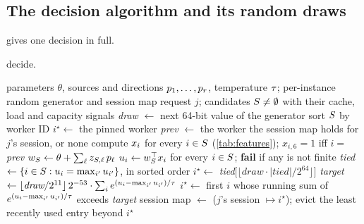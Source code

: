 \subsection{The decision algorithm and its random draws}

 gives one decision in full.

\begin{algorithm}[tbp]
\caption{One \lc{} decision. Before the call, the host has fixed the eligible set $\cand$ and
  written each candidate's default cost $\cdef_i$ at default weights. The draw discipline is
  ; under  there is no up-front draw, a tie draws once per tied
  candidate during the scan, a sample draws one uniform, and a pin draws nothing, as in
  .}
\label{alg:decide}
\expandafter\def\csname theHALG@line\endcsname{decide.}%
\begin{algorithmic}[1]
\Require parameters $\theta$, sources and directions $p_1,\dots,p_{r}$, temperature $\tau$;
  per-instance random generator and session map
\Require request $j$; candidates $S \ne \emptyset$ with their cache, load and capacity signals
\State \textit{draw} $\gets$ next 64-bit value of the generator 
\State sort $\cand$ by worker ID 
  \State $i^{\star} \gets$ the pinned worker
\Else
  \State \textit{prev} $\gets$ the worker the session map holds for $j$'s session, or none
  \State compute $x_i$ for every $i \in S$ (\cref{tab:features}); $x_{i,6} = 1$ iff $i = $ \textit{prev}
  \State $w_{S} \gets \theta + \sum_{\ell} z_{S,\ell}\, p_{\ell}$
  \State $u_i \gets w_{S}^{\top}x_i$ for every $i \in S$; \textbf{fail} if any is not finite
    \State \textit{tied} $\gets \{i \in S : u_i = \max_{i'} u_{i'}\}$, in sorted order
    \State $i^{\star} \gets$ \textit{tied}$\big[\lfloor \textit{draw} \cdot |\textit{tied}| / 2^{64} \rfloor\big]$
  \Else
    \State \textit{target} $\gets \lfloor \textit{draw}/2^{11} \rfloor\, 2^{-53} \cdot \sum_{i} e^{(u_i - \max_{i'}u_{i'})/\tau}$
    \State $i^{\star} \gets$ first $i$ whose running sum of $e^{(u_i - \max_{i'}u_{i'})/\tau}$ exceeds \textit{target}
  \EndIf
\EndIf
{}
  \State session map $\gets$ ($j$'s session $\mapsto i^{\star}$); evict the least recently used entry beyond 
\EndIf
\State \Return $i^{\star}$
\end{algorithmic}
\end{algorithm}


